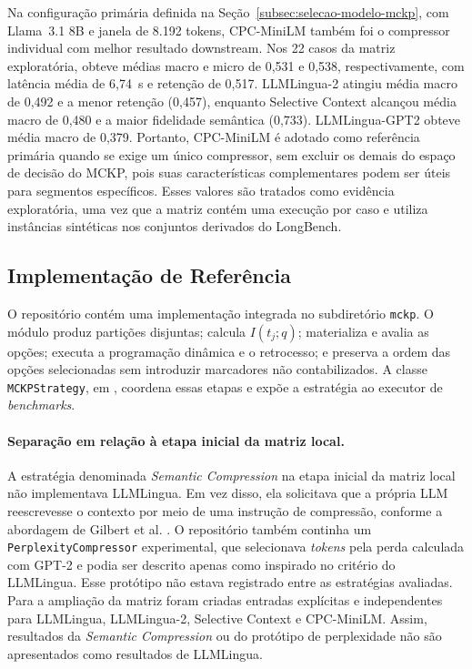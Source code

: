 Na configuração primária definida na Seção~\ref{subsec:selecao-modelo-mckp}, com Llama~3.1 8B e janela de 8.192 tokens, CPC-MiniLM também foi o compressor individual com melhor resultado downstream. Nos 22 casos da matriz exploratória, obteve médias macro e micro de 0,531 e 0,538, respectivamente, com latência média de 6,74~s e retenção de 0,517. LLMLingua-2 atingiu média macro de 0,492 e a menor retenção (0,457), enquanto Selective Context alcançou média macro de 0,480 e a maior fidelidade semântica (0,733). LLMLingua-GPT2 obteve média macro de 0,379. Portanto, CPC-MiniLM é adotado como referência primária quando se exige um único compressor, sem excluir os demais do espaço de decisão do MCKP, pois suas características complementares podem ser úteis para segmentos específicos. Esses valores são tratados como evidência exploratória, uma vez que a matriz contém uma execução por caso e utiliza instâncias sintéticas nos conjuntos derivados do LongBench.

\subsection{Implementação de Referência}
\label{subsec:implementacao}

O repositório contém uma implementação integrada no subdiretório \texttt{mckp}. O módulo  produz partições disjuntas;  calcula $I(t_j;q)$;  materializa e avalia as opções;  executa a programação dinâmica e o retrocesso; e  preserva a ordem das opções selecionadas sem introduzir marcadores não contabilizados. A classe \texttt{MCKPStrategy}, em , coordena essas etapas e expõe a estratégia ao executor de \textit{benchmarks}.

\paragraph{Separação em relação à etapa inicial da matriz local.}
A estratégia denominada \textit{Semantic Compression} na etapa inicial da matriz local não implementava LLMLingua. Em vez disso, ela solicitava que a própria LLM reescrevesse o contexto por meio de uma instrução de compressão, conforme a abordagem de Gilbert et al. \cite{gilbert2023semanticcompression}. O repositório também continha um \texttt{PerplexityCompressor} experimental, que selecionava \textit{tokens} pela perda calculada com GPT-2 e podia ser descrito apenas como inspirado no critério do LLMLingua. Esse protótipo não estava registrado entre as estratégias avaliadas. Para a ampliação da matriz foram criadas entradas explícitas e independentes para LLMLingua, LLMLingua-2, Selective Context e CPC-MiniLM. Assim, resultados da \textit{Semantic Compression} ou do protótipo de perplexidade não são apresentados como resultados de LLMLingua.

